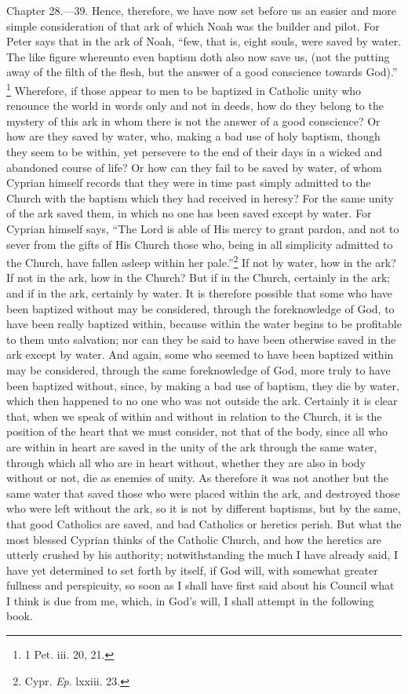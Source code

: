 Chapter 28.—39. Hence, therefore, we have now set before us an easier and more simple consideration of that ark of which Noah was the builder and pilot. For Peter says that in the ark of Noah, ``few, that is, eight souls, were saved by water. The like figure whereunto even baptism doth also now save us, (not the putting away of the filth of the flesh, but the answer of a good conscience towards God).'' \footnote{\par  1 Pet. iii. 20, 21.} Wherefore, if those appear to men to be baptized in Catholic unity who renounce the world in words only and not in deeds, how do they belong to the mystery of this ark in whom there is not the answer of a good conscience? Or how are they saved by water, who, making a bad use of holy baptism, though they seem to be within, yet persevere to the end of their days in a wicked and abandoned course of life? Or how can they fail to be saved by water, of whom Cyprian himself records that they were in time past simply admitted to the Church with the baptism which they had received in heresy? For the same unity of the ark saved them, in which no one has been saved except by water. For Cyprian himself says, ``The Lord is able of His mercy to grant pardon, and not to sever from the gifts of His Church those who, being in all simplicity admitted to the Church, have fallen asleep within her pale.''\footnote{\par  Cypr. \emph{Ep}. lxxiii. 23.} If not by water, how in the ark? If not in the ark, how in the Church? But if in the Church, certainly in the ark; and if in the ark, certainly by water. It is therefore possible that some who have been baptized without may be considered, through the foreknowledge of God, to have been really baptized within, because within the water begins to be profitable to them unto salvation; nor can they be said to have been otherwise saved in the ark except by water. And again, some who seemed to have been baptized within may be considered, through the same foreknowledge of God, more truly to have been baptized without, since, by making a bad use of baptism, they die by water, which then happened to no one who was not outside the ark. Certainly it is clear that, when we speak of within and without in relation to the Church, it is the position of the heart that we must consider, not that of the body, since all who are within in heart are saved in the unity of the ark through the same water, through which all who are in heart without, whether they are also in body without or not, die as enemies of unity. As therefore it was not another but the same water that saved those who were placed within the ark, and destroyed those who were left without the ark, so it is not by different baptisms, but by the same, that good Catholics are saved, and bad Catholics or heretics perish. But what the most blessed Cyprian thinks of the Catholic Church, and how the heretics are utterly crushed by his authority; notwithstanding the much I have already said, I have yet determined to set forth by itself, if God will, with somewhat greater fullness and perspicuity, so soon as I shall have first said about his Council what I think is due from me, which, in God’s will, I shall attempt in the following book.

